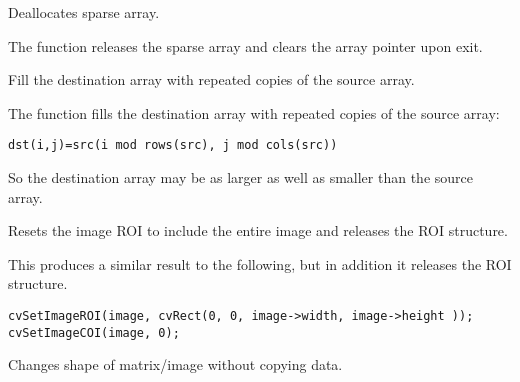 Deallocates sparse array.


\begin{description}
\end{description}

The function releases the sparse array and clears the array pointer upon exit.

\fi

Fill the destination array with repeated copies of the source array.


\begin{description}
\end{description}

The function fills the destination array with repeated copies of the source array:

\begin{lstlisting}
dst(i,j)=src(i mod rows(src), j mod cols(src))
\end{lstlisting}

So the destination array may be as larger as well as smaller than the source array.

Resets the image ROI to include the entire image and releases the ROI structure.


\begin{description}
\end{description}

This produces a similar result to the following, but in addition it releases the ROI structure.

\begin{lstlisting}
cvSetImageROI(image, cvRect(0, 0, image->width, image->height ));
cvSetImageCOI(image, 0);
\end{lstlisting}


Changes shape of matrix/image without copying data.


